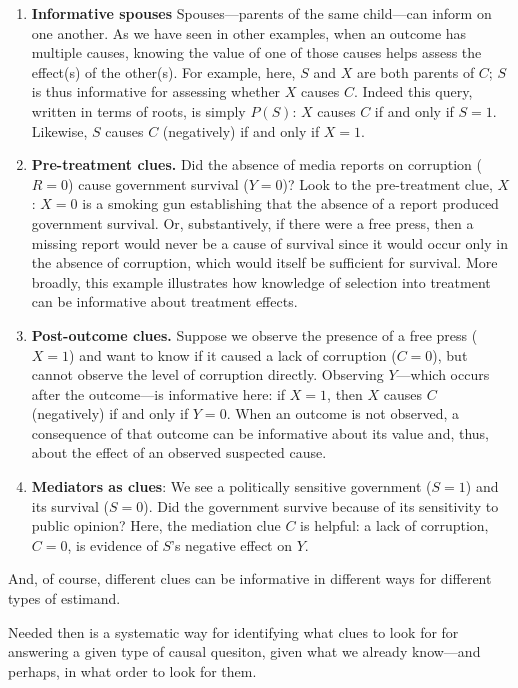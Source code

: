 \documentclass[12pt,]{book}
\begin{document}
\begin{enumerate}
\def\labelenumi{\arabic{enumi}.}
\item
  \textbf{Informative spouses} Spouses---parents of the same child---can inform on one another. As we have seen in other examples, when an outcome has multiple causes, knowing the value of one of those causes helps assess the effect(s) of the other(s). For example, here, \(S\) and \(X\) are both parents of \(C\); \(S\) is thus informative for assessing whether \(X\) causes \(C\). Indeed this query, written in terms of roots, is simply \(P(S)\): \(X\) causes \(C\) if and only if \(S=1\). Likewise, \(S\) causes \(C\) (negatively) if and only if \(X=1\).
\item
  \textbf{Pre-treatment clues.} Did the absence of media reports on corruption (\(R=0\)) cause government survival (\(Y=0\))? Look to the pre-treatment clue, \(X\): \(X=0\) is a smoking gun establishing that the absence of a report produced government survival. Or, substantively, if there were a free press, then a missing report would never be a cause of survival since it would occur only in the absence of corruption, which would itself be sufficient for survival. More broadly, this example illustrates how knowledge of selection into treatment can be informative about treatment effects.
\item
  \textbf{Post-outcome clues.} Suppose we observe the presence of a free press (\(X=1\)) and want to know if it caused a lack of corruption (\(C=0\)), but cannot observe the level of corruption directly. Observing \(Y\)---which occurs after the outcome---is informative here: if \(X=1\), then \(X\) causes \(C\) (negatively) if and only if \(Y=0\). When an outcome is not observed, a consequence of that outcome can be informative about its value and, thus, about the effect of an observed suspected cause.
\item
  \textbf{Mediators as clues}: We see a politically sensitive government (\(S=1\)) and its survival (\(S=0\)). Did the government survive because of its sensitivity to public opinion? Here, the mediation clue \(C\) is helpful: a lack of corruption, \(C=0\), is evidence of \(S\)'s negative effect on \(Y\).
\end{enumerate}

And, of course, different clues can be informative in different ways for different types of estimand.

Needed then is a systematic way for identifying what clues to look for for answering a given type of causal quesiton, given what we already know---and perhaps, in what order to look for them.
\end{document}
